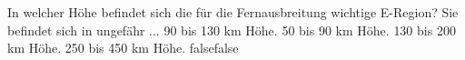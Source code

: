     {In welcher Höhe befindet sich die für die Fernausbreitung wichtige E-Region? Sie befindet sich in ungefähr ...}
    {90 bis 130 km Höhe.}
    {50 bis 90 km Höhe.}
    {130 bis 200 km Höhe.}
    {250 bis 450 km Höhe.}
    {false}{false}